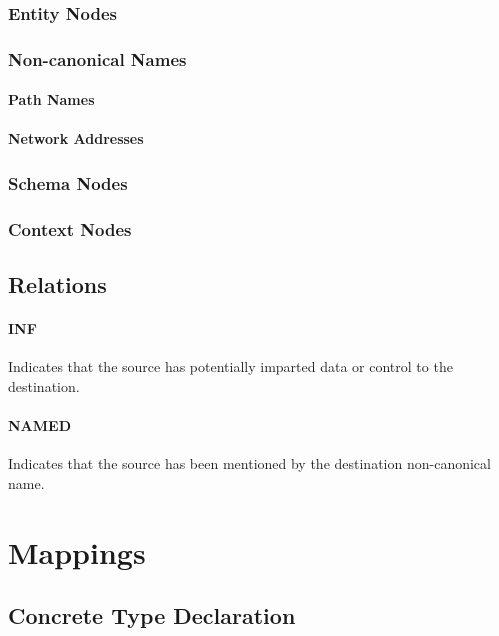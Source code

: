 \documentclass[12pt,twoside,openright,a4paper]{article}
\begin{document}
\subsubsection{Entity Nodes}

\subsubsection{Non-canonical Names}

\paragraph{Path Names}

\paragraph{Network Addresses}

\subsubsection{Schema Nodes}

\subsubsection{Context Nodes}

\subsection{Relations}

\paragraph{INF}
Indicates that the source has potentially imparted data or control to the destination.

\paragraph{NAMED}
Indicates that the source has been mentioned by the destination non-canonical name.

\section{Mappings}

\subsection{Concrete Type Declaration}
\end{document}

